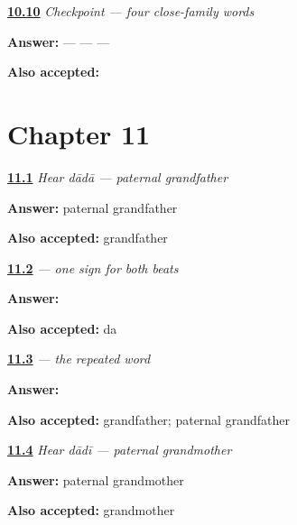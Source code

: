 \noindent\begin{minipage}[t]{\linewidth}
\raggedright
\hyperlink{review-MW-C08-family-four-payoff}{\textbf{10.10}} \emph{Checkpoint — four close-family words}\par
\small \textbf{Answer:}  —  —  — \par
\footnotesize \textbf{Also accepted:}    
\end{minipage}\par\medskip

\section*{Chapter 11}

\noindent\begin{minipage}[t]{\linewidth}
\raggedright
\hyperlink{review-MW-C08-hear-dada-meaning}{\textbf{11.1}} \emph{Hear \emph{dādā} — paternal grandfather}\par
\small \textbf{Answer:} paternal grandfather\par
\footnotesize \textbf{Also accepted:} grandfather
\end{minipage}\par\medskip

\noindent\begin{minipage}[t]{\linewidth}
\raggedright
\hyperlink{review-MW-W08-da-write}{\textbf{11.2}} \emph{ — one sign for both beats}\par
\small \textbf{Answer:} \par
\footnotesize \textbf{Also accepted:}  da
\end{minipage}\par\medskip

\noindent\begin{minipage}[t]{\linewidth}
\raggedright
\hyperlink{review-MW-C08-dada-dictation}{\textbf{11.3}} \emph{ — the repeated word}\par
\small \textbf{Answer:} \par
\footnotesize \textbf{Also accepted:}  grandfather;  paternal grandfather
\end{minipage}\par\medskip

\noindent\begin{minipage}[t]{\linewidth}
\raggedright
\hyperlink{review-MW-C08-hear-dadi-meaning}{\textbf{11.4}} \emph{Hear \emph{dādī} — paternal grandmother}\par
\small \textbf{Answer:} paternal grandmother\par
\footnotesize \textbf{Also accepted:} grandmother
\end{minipage}\par\medskip

